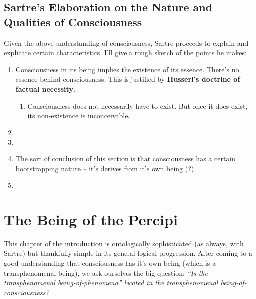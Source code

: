 \subsection{Sartre's Elaboration on the Nature and Qualities of Consciousness}
Given the above understanding of consciousness, Sartre proceeds to explain and explicate certain characteristics. I'll give a rough sketch of the points he makes:

\begin{enumerate}
  \item Consciousness in its being implies the existence of its essence. There's no essence behind consciousness. This is justified by \textbf{Husserl's doctrine of factual necessity}:
  \begin{enumerate}
    \item Consciousness does not necessarily have to exist. But once it does exist, its non-existence is inconceivable.
  \end{enumerate}
  \item {}
  \item {}
  \item The sort of conclusion of this section is that consciousness has a certain bootstrapping nature -- it's derives from it's own being (?)
  \item {}
\end{enumerate}

\section{The Being of the Percipi}

This chapter of the introduction is ontologically sophisticated (as always, with Sartre) but thankfully simple in its general logical progression. After coming to a good understanding that consciousness has it's own being (which is a transphenomenal being), we ask ourselves the big question: \emph{\enquote{Is the transphenomenal being-of-phenomena} located in the transphenomenal being-of-consciousness?}


